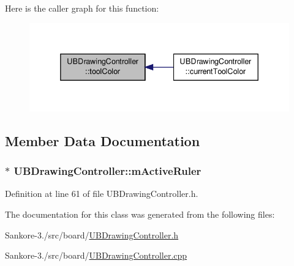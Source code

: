 Here is the caller graph for this function\-:
\nopagebreak
\begin{figure}[H]
\begin{center}
\leavevmode
\includegraphics[width=336pt]{d0/d58/class_u_b_drawing_controller_afae64ee4b072bcc20b5234eec4dc5f56_icgraph}
\end{center}
\end{figure}




\subsection{Member Data Documentation}
\hypertarget{class_u_b_drawing_controller_a08b17daa8e837ad621058156d633c518}{
\subsubsection[{m\-Active\-Ruler}]{$\ast$ U\-B\-Drawing\-Controller\-::m\-Active\-Ruler}}\label{d0/d58/class_u_b_drawing_controller_a08b17daa8e837ad621058156d633c518}


Definition at line 61 of file U\-B\-Drawing\-Controller.\-h.



The documentation for this class was generated from the following files\-:\begin{DoxyCompactItemize}
\item 
Sankore-\/3./src/board/\hyperlink{_u_b_drawing_controller_8h}{U\-B\-Drawing\-Controller.\-h}\item 
Sankore-\/3./src/board/\hyperlink{_u_b_drawing_controller_8cpp}{U\-B\-Drawing\-Controller.\-cpp}\end{DoxyCompactItemize}
